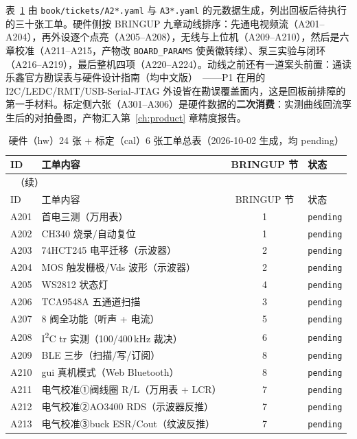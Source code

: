 表~\ref{tab:acc-hw-tickets} 由 \texttt{book/tickets/A2*.yaml} 与 \texttt{A3*.yaml} 的元数据生成，列出回板后待执行的三十张工单。硬件侧按 BRINGUP 九章动线排序：先通电视频流（A201--A204），再外设逐个点亮（A205--A208），无线与上位机（A209--A210），然后是六章校准（A211--A215，产物改 \texttt{BOARD\_PARAMS} 使黄徽转绿）、泵三实验与闭环（A216--A219），最后整机四项（A220--A224）。动线之前还有一道案头前置：通读乐鑫官方勘误表与硬件设计指南（均中文版）~\cite{esp32s3-errata-cn,esp32s3-hw-guidelines-cn}——P1 在用的 I2C/LEDC/RMT/USB-Serial-JTAG 外设皆在勘误覆盖面内，这是回板前排障的第一手材料。标定侧六张（A301--A306）是硬件数据的\textbf{二次消费}：实测曲线回流孪生后的对拍叠图，产物汇入第~\ref{ch:product} 章精度报告。

\begin{longtable}{@{}llc@{}l@{}}
  \caption{硬件（hw）24 张 + 标定（cal）6 张工单总表（2026-10-02 生成，均 pending）}\label{tab:acc-hw-tickets}\\
  \toprule
  ID & 工单内容 & BRINGUP 节 & 状态 \\
  \midrule
  \endfirsthead
  \multicolumn{4}{l}{\tablename~\thetable{}（续）}\\
  \toprule
  ID & 工单内容 & BRINGUP 节 & 状态 \\
  \midrule
  \endhead
  \bottomrule
  \endfoot
  \endlastfoot
  A201 & 首电三测（万用表） & 1 & \texttt{pending} \\
  A202 & CH340 烧录/自动复位 & 1 & \texttt{pending} \\
  A203 & 74HCT245 电平迁移（示波器） & 2 & \texttt{pending} \\
  A204 & MOS 触发栅极/Vds 波形（示波器） & 2 & \texttt{pending} \\
  A205 & WS2812 状态灯 & 4 & \texttt{pending} \\
  A206 & TCA9548A 五通道扫描 & 3 & \texttt{pending} \\
  A207 & 8 阀全功能（听声 + 电流） & 5 & \texttt{pending} \\
  A208 & I\textsuperscript{2}C tr 实测（100/400\,kHz 裁决） & 6 & \texttt{pending} \\
  A209 & BLE 三步（扫描/写/订阅） & 8 & \texttt{pending} \\
  A210 & gui 真机模式（Web Bluetooth） & 8 & \texttt{pending} \\
  A211 & 电气校准①阀线圈 R/L（万用表 + LCR） & 7 & \texttt{pending} \\
  A212 & 电气校准②AO3400 RDS（示波器反推） & 7 & \texttt{pending} \\
  A213 & 电气校准③buck ESR/Cout（纹波反推） & 7 & \texttt{pending} \\

\end{longtable}
